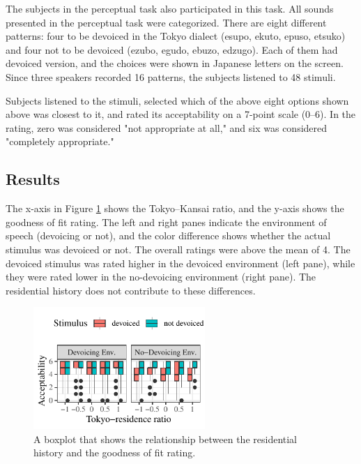 \documentclass[a4paper,11pt,twocolumn]{article}
\begin{document}
The subjects in the perceptual task also participated in this task. All sounds presented in the perceptual task were categorized. There are eight different patterns: four to be devoiced in the Tokyo dialect (esupo, ekuto, epuso, etsuko) and four not to be devoiced (ezubo, egudo, ebuzo, edzugo). Each of them had devoiced version, and the choices were shown in Japanese letters on the screen. Since three speakers recorded 16 patterns, the subjects listened to 48 stimuli.

Subjects listened to the stimuli, selected which of the above eight options shown above was closest to it, and rated its acceptability on a 7-point scale (0--6). In the rating, zero was considered "not appropriate at all," and six was considered "completely appropriate."

\subsection{Results}

The x-axis in Figure \ref{fig:cat_results} shows the Tokyo--Kansai ratio, and the y-axis shows the goodness of fit rating. The left and right panes indicate the environment of speech (devoicing or not), and the color difference shows whether the actual stimulus was devoiced or not. The overall ratings were above the mean of 4. The devoiced stimulus was rated higher in the devoiced environment (left pane), while they were rated lower in the no-devoicing environment (right pane). The residential history does not contribute to these differences.
\begin{figure}[!ht]
\begin{center}
\includegraphics[width=6.5cm]{../results/artifact/results_categorization.pdf}
\caption{A boxplot that shows the relationship between the residential history and the goodness of fit rating.}\label{fig:cat_results}
\end{center}
\end{figure}
\end{document}

